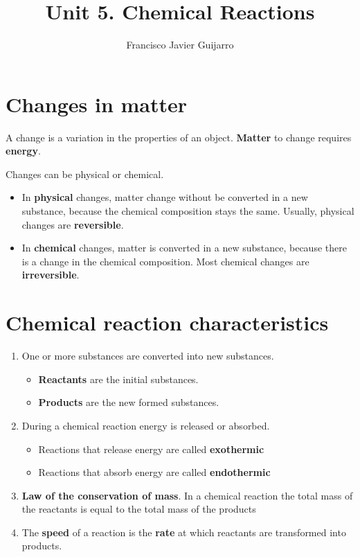 \documentclass{article}
\title{Unit 5. Chemical Reactions}
\author{Francisco Javier Guijarro}
\begin{document}
	\maketitle
	
	\section{Changes in matter}
	
		A change is a variation in the properties of an object. \textbf{Matter} to change requires \textbf{energy}.
	
	
		Changes can be physical or chemical. 
	
		\begin{itemize}
			\item In \textbf{physical} changes, matter change without be converted in a new substance, because the chemical composition stays the same. Usually, physical changes are \textbf{reversible}.
			\item In \textbf{chemical} changes, matter is converted in a new substance, because there is a change in the chemical composition. Most chemical changes are \textbf{irreversible}.

		\end{itemize}
	
	\section{Chemical reaction characteristics}
	
		\begin{enumerate}
			\item One or more substances are converted into new substances.
				\begin{itemize}
					\item \textbf{Reactants} are the initial substances.
					\item \textbf{Products} are the new formed substances. \par 
				\end{itemize}  
			\item During a chemical reaction energy is released or absorbed.
				\begin{itemize}
					\item Reactions that release energy are called \textbf{exothermic}
					\item Reactions that absorb energy are called \textbf{endothermic}
				\end{itemize}
			\item \textbf{Law of the conservation of mass}. In a chemical reaction the total mass of the reactants is equal to the total mass of the products
			\item The \textbf{speed} of a reaction is the \textbf{rate} at which reactants are transformed into products.
				
		\end{enumerate}
		
\end{document}
